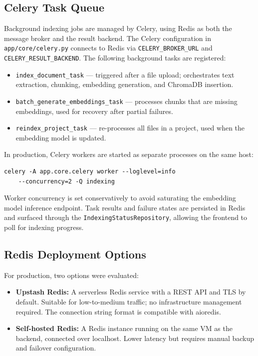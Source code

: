 \subsection{Celery Task Queue}

Background indexing jobs are managed by Celery, using Redis as both the message broker and the result backend. The Celery configuration in \texttt{app/core/celery.py} connects to Redis via \texttt{CELERY\_BROKER\_URL} and \texttt{CELERY\_RESULT\_BACKEND}. The following background tasks are registered:

\begin{itemize}
    \item \texttt{index\_document\_task} — triggered after a file upload; orchestrates text extraction, chunking, embedding generation, and ChromaDB insertion.
    \item \texttt{batch\_generate\_embeddings\_task} — processes chunks that are missing embeddings, used for recovery after partial failures.
    \item \texttt{reindex\_project\_task} — re-processes all files in a project, used when the embedding model is updated.
\end{itemize}

In production, Celery workers are started as separate processes on the same host:

\begin{verbatim}
celery -A app.core.celery worker --loglevel=info
    --concurrency=2 -Q indexing
\end{verbatim}

Worker concurrency is set conservatively to avoid saturating the embedding model inference endpoint. Task results and failure states are persisted in Redis and surfaced through the \texttt{IndexingStatusRepository}, allowing the frontend to poll for indexing progress.

\subsection{Redis Deployment Options}

For production, two options were evaluated:

\begin{itemize}
    \item \textbf{Upstash Redis:} A serverless Redis service with a REST API and TLS by default. Suitable for low-to-medium traffic; no infrastructure management required. The connection string format is compatible with aioredis.
    \item \textbf{Self-hosted Redis:} A Redis instance running on the same VM as the backend, connected over localhost. Lower latency but requires manual backup and failover configuration.
\end{itemize}

